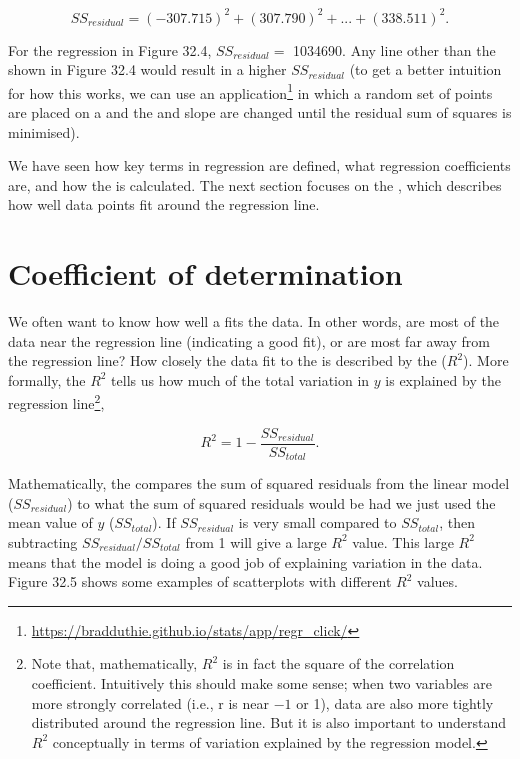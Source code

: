 \documentclass[
  openany]{krantz}
\begin{document}
\[SS_{residual} = (-307.715)^{2} + (307.790)^2 + ... + (338.511)^{2}.\]

For the regression in Figure 32.4, \(SS_{residual} =\) 1034690.
Any line other than the  shown in Figure 32.4 would result in a higher \(SS_{residual}\) (to get a better intuition for how this works, we can use an  application\footnote{\url{https://bradduthie.github.io/stats/app/regr_click/}} in which a random set of points are placed on a  and the  and slope are changed until the residual sum of squares is minimised).

We have seen how key terms in regression are defined, what regression coefficients are, and how the  is calculated.
The next section focuses on the , which describes how well data points fit around the regression line.

\hypertarget{coefficient-of-determination}{%
\section{Coefficient of determination}\label{coefficient-of-determination}}

We often want to know how well a  fits the data.
In other words, are most of the data near the regression line (indicating a good fit), or are most far away from the regression line?
How closely the data fit to the  is described by the \textbf{} (\(R^{2}\)).
More formally, the \(R^{2}\) tells us how much of the total variation in \(y\) is explained by the regression line\footnote{Note that, mathematically, \(R^{2}\) is in fact the square of the correlation coefficient. Intuitively this should make some sense; when two variables are more strongly correlated (i.e., r is near \(-1\) or 1), data are also more tightly distributed around the regression line. But it is also important to understand \(R^{2}\) conceptually in terms of variation explained by the regression model.},

\[R^{2} = 1 - \frac{SS_{residual}}{SS_{total}}.\]

Mathematically, the  compares the sum of squared residuals from the linear model (\(SS_{residual}\)) to what the sum of squared residuals would be had we just used the mean value of \(y\) (\(SS_{total}\)).
If \(SS_{residual}\) is very small compared to \(SS_{total}\), then subtracting \(SS_{residual}/SS_{total}\) from 1 will give a large \(R^{2}\) value.
This large \(R^{2}\) means that the model is doing a good job of explaining variation in the data.
Figure 32.5 shows some examples of scatterplots with different \(R^{2}\) values.
\end{document}
